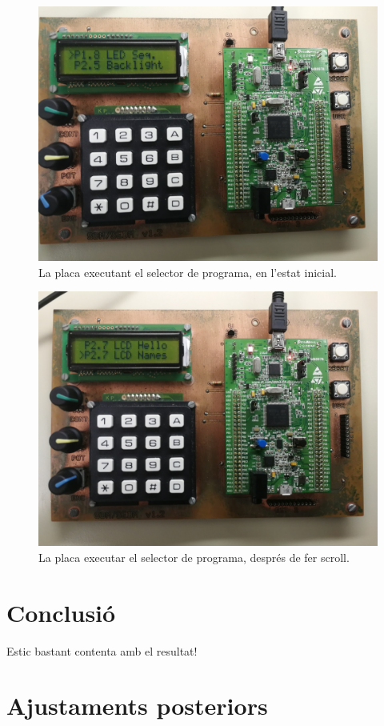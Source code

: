 \begin{figure}[p] %
  \includegraphics[width=.82\columnwidth]{../photos/board/selector-initial}
  \caption{ \label{fig:selector-board-initial} La placa executant el selector de programa, en l'estat inicial. }
\end{figure}
\begin{figure}[p]
  \includegraphics[width=.82\columnwidth]{../photos/board/selector-use}
  \caption{ \label{fig:selector-board-use} La placa executar el selector de programa, després de fer scroll. }
\end{figure}


\section{Conclusió}

Estic bastant contenta amb el resultat!

\section{Ajustaments posteriors}

